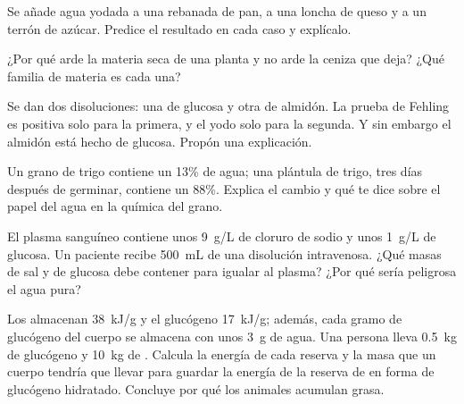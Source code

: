 \begin{exercise}[$\star\star$]\label{exo:g10:chemistry-of-life:9}
Se añade agua yodada a una rebanada de pan, a una loncha de queso y a
un terrón de azúcar. Predice el resultado en cada caso y explícalo.
\end{exercise}

\begin{exercise}[$\star\star$]\label{exo:g10:chemistry-of-life:10}
¿Por qué arde la materia seca de una planta y no arde la ceniza que
deja? ¿Qué familia de materia es cada una?
\end{exercise}

\begin{exercise}[$\star\star$]\label{exo:g10:chemistry-of-life:11}
Se dan dos disoluciones: una de glucosa y otra de almidón. La prueba de
Fehling es positiva solo para la primera, y el yodo solo para la
segunda. Y sin embargo el almidón está hecho de glucosa. Propón una
explicación.
\end{exercise}

\begin{exercise}[$\star\star\star$]\label{exo:g10:chemistry-of-life:12}
Un grano de trigo contiene un 13\% de agua; una plántula de trigo, tres
días después de germinar, contiene un 88\%. Explica el cambio y qué te
dice sobre el papel del agua en la química del grano.
\end{exercise}

\begin{exercise}[$\star\star\star$]\label{exo:g10:chemistry-of-life:13}
El plasma sanguíneo contiene unos \qty{9}{g/L} de cloruro de sodio y
unos \qty{1}{g/L} de glucosa. Un paciente recibe \qty{500}{mL} de una
disolución intravenosa. ¿Qué masas de sal y de glucosa debe contener
para igualar al plasma? ¿Por qué sería peligrosa el agua pura?
\end{exercise}

\begin{exercise}[$\star\star\star$]\label{exo:g10:chemistry-of-life:14}
Los  almacenan \qty{38}{kJ/g} y el glucógeno \qty{17}{kJ/g};
además, cada gramo de glucógeno del cuerpo se almacena con unos
\qty{3}{g} de agua. Una persona lleva \qty{0.5}{kg} de glucógeno y
\qty{10}{kg} de . Calcula la energía de cada reserva y la masa
que un cuerpo tendría que llevar para guardar la energía de la reserva
de  en forma de glucógeno hidratado. Concluye por qué los
animales acumulan grasa.
\end{exercise}

